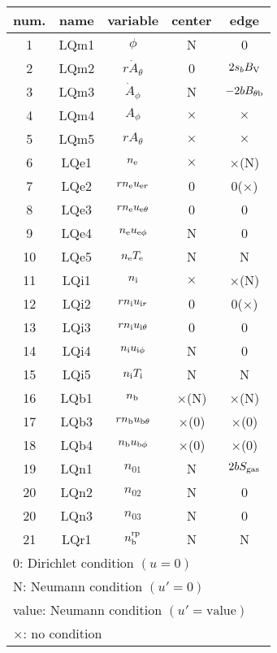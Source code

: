 \documentclass[11pt]{article}
\def\r#1{{\rm#1}}
\def\nee{n_\r{e}}
\def\ni{n_\r{i}}
\def\nb{n_\r{b}}
\def\uer{u_{\r{e}r}}
\def\uir{u_{\r{i}r}}
\def\ueth{u_{\r{e}\theta}}
\def\uith{u_{\r{i}\theta}}
\def\ubth{u_{\r{b}\theta}}
\def\ueph{u_{\r{e}\phi}}
\def\uiph{u_{\r{i}\phi}}
\def\ubph{u_{\r{b}\phi}}
\def\Athd{\dot{A}_\theta}
\def\Aphd{\dot{A}_\phi}
\def\Ath{A_\theta}
\def\Aph{A_\phi}
\def\Te{T_\r{e}}
\def\Ti{T_\r{i}}
\def\nna{n_{01}}
\def\nnb{n_{02}}
\def\nnc{n_{03}}
\def\nbrp{n_\r{b}^\r{rp}}
\begin{document}
\begin{tabular}{|c|c|c|c|c|}\hline
 num. & name & variable      & center & edge \\\hline
 1    & LQm1 & $\phi$        & N        & 0\\
 2    & LQm2 & $r \Athd$     & 0        & $2s_b B_\r{V}$\\
 3    & LQm3 & $\Aphd$       & N        & $-2bB_{\theta\r{b}}$\\
 4    & LQm4 & $\Aph$        & $\times$ & $\times$\\
 5    & LQm5 & $r \Ath$      & $\times$ & $\times$\\
 6    & LQe1 & $\nee$         & $\times$ & $\times$(N)\\
 7    & LQe2 & $r \nee \uer$  & 0        & 0($\times$)\\
 8    & LQe3 & $r \nee \ueth$ & 0        & 0\\
 9    & LQe4 & $\nee \ueph$   & N        & 0\\
 10   & LQe5 & $\nee \Te$     & N        & N\\
 11   & LQi1 & $\ni$         & $\times$ & $\times$(N)\\
 12   & LQi2 & $r \ni \uir$  & 0        & 0($\times$)\\
 13   & LQi3 & $r \ni \uith$ & 0        & 0\\
 14   & LQi4 & $\ni \uiph$   & N        & 0\\
 15   & LQi5 & $\ni \Ti$     & N        & N\\
 16   & LQb1 & $\nb$         & $\times$(N) & $\times$(N)\\
 17   & LQb3 & $r \nb \ubth$ & $\times$(0) & $\times$(0)\\
 18   & LQb4 & $\nb \ubph$   & $\times$(0) & $\times$(0)\\
 19   & LQn1 & $\nna$        & N        & $2bS_\r{gas}$\\
 20   & LQn2 & $\nnb$        & N        & 0\\
 20   & LQn3 & $\nnc$        & N        & 0\\
 21   & LQr1 & $\nbrp$       & N        & N\\\hline
 \multicolumn{5}{l}{0: Dirichlet condition $(u=0)$}\\
 \multicolumn{5}{l}{N: Neumann condition $(u'=0)$}\\
 \multicolumn{5}{l}{value: Neumann condition $(u'=\mbox{value})$}\\
 \multicolumn{5}{l}{$\times$: no condition}
\end{tabular}
\end{document}
